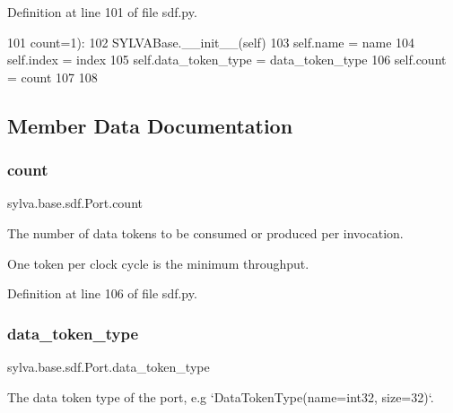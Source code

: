 Definition at line 101 of file sdf.\+py.


\begin{DoxyCode}
101                  count=1):
102         SYLVABase.\_\_init\_\_(self)
103         self.name = name
104         self.index = index
105         self.data\_token\_type = data\_token\_type
106         self.count = count
107 
108 
\end{DoxyCode}


\subsection{Member Data Documentation}
\mbox{\label{classsylva_1_1base_1_1sdf_1_1_port_aec009757acfd92df95b273c671cac068}} 
\subsubsection{\texorpdfstring{count}{count}}
{\footnotesize\ttfamily sylva.\+base.\+sdf.\+Port.\+count}



The number of data tokens to be consumed or produced per invocation. 

One token per clock cycle is the minimum throughput. 

Definition at line 106 of file sdf.\+py.

\mbox{\label{classsylva_1_1base_1_1sdf_1_1_port_ac0ca6b47887a32c69c66564f683adf2b}} 
\subsubsection{\texorpdfstring{data\+\_\+token\+\_\+type}{data\_token\_type}}
{\footnotesize\ttfamily sylva.\+base.\+sdf.\+Port.\+data\+\_\+token\+\_\+type}



The data token type of the port, e.\+g `\+Data\+Token\+Type(name=\textquotesingle{}int32\textquotesingle{}, size=32)`. 



